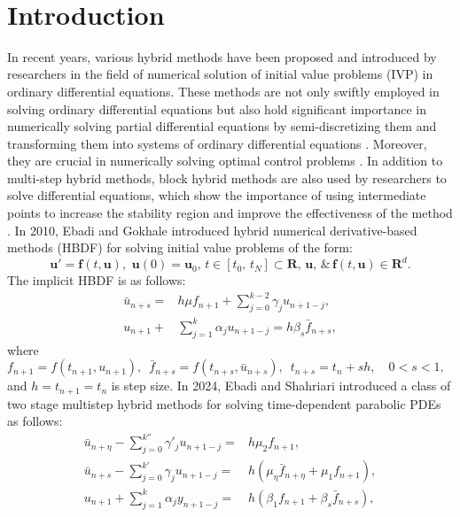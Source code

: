 ‎\documentclass[a4paper,10pt]{article}‎
\begin{document}
\section{\textbf{Introduction}}
In recent years, various hybrid methods have been proposed and introduced by researchers in the field of numerical solution of initial value problems (IVP) in ordinary differential equations. These methods are not only swiftly employed in solving ordinary differential equations but also hold significant importance in numerically solving partial differential equations by semi-discretizing them and transforming them into systems of ordinary differential equations \cite{ALI6,ALI3,ALI5,ALI4,ALI2,ALI1}. Moreover, they are crucial in numerically solving optimal control problems \cite{OCP1,OCP2,OCP3}. In addition to multi-step hybrid methods, block hybrid methods are also used by researchers to solve differential equations, which show the importance of using intermediate points to increase the stability region and improve the effectiveness of the method  \cite{Q24, R23}. In 2010, Ebadi and Gokhale \cite{ALI1} introduced hybrid numerical derivative-based methods (HBDF) for solving initial value problems of the  form:
\begin{equation}\label{1.2}
\boldsymbol{u'}=\boldsymbol{f}(t,\boldsymbol{u}),\,\, \boldsymbol{u}(0)=\boldsymbol{u}_{0},\, t\in [t_{0},\,t_{N}]\subset \mathbf{R},\,\boldsymbol{u},\,\&\, \boldsymbol{f}(t, \boldsymbol{u}) \in\mathbf{R} ^{d}.
\end{equation}
The implicit HBDF is as follows:
\begin{align*}
 \bar{u}_{n+s}=& h\mu f_{n+1}+\sum_{j=0}^{k-2}\gamma_{j}u_{n+1-j},\\
 u_{n+1}+&\sum_{j=1}^{k}\alpha_{j}u_{n+1-j}=   h\beta_{s}\bar{f}_{n+s},
\end{align*}
where
$f_{n+1}=f(t_{n+1},u_{n+1}),\,\,\,\bar{f}_{n+s}=f(t_{n+s}, \bar{u}_{n+s}),\,\,\, t_{n+s}=t_{n}+sh,\quad 0< s <1,$ and $h=t_{n+1}=t_{n}$ is step size.
In 2024, Ebadi and Shahriari \cite{ALI6} introduced  a  class of two stage multistep hybrid methods for solving time-dependent parabolic PDEs as follows:
\begin{align}
 \bar{u}_{n+\eta}-\sum_{j=0}^{k''}\gamma'_{j} u_{n+1-j}=& h \mu_{2} f_{n+1},\label{2.1}\\
 \bar{u}_{n+s}-\sum_{j=0}^{k'}\gamma_{j}u_{n+1-j}=& h(\mu_{\eta} \bar{ f}_{n+\eta}+ \mu_{1} f_{n+1}),\label{2.2}\\
u_{n+1}+\sum_{j=1}^{k}\alpha_{j}y_{n+1-j}= &  h(\beta_{1}f_{n+1}+\beta_{s}\bar{f}_{n+s}), \label{2.3}
\end{align}
\end{document}
